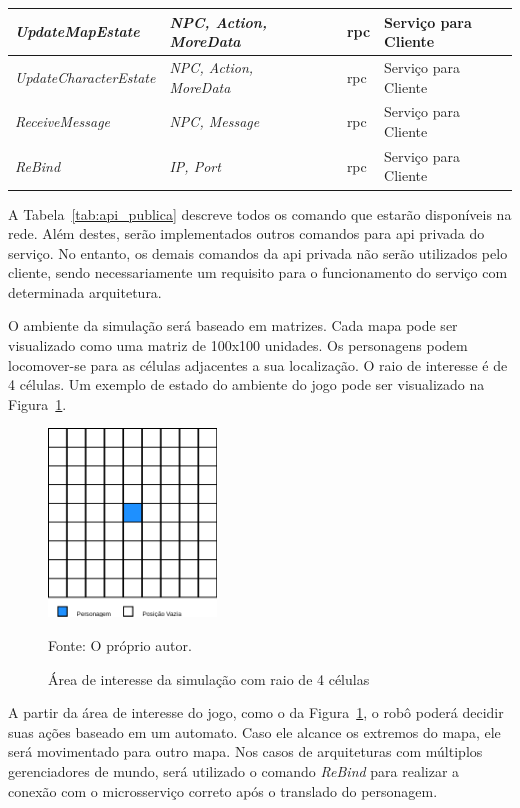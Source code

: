 \begin{table}[htb!]
\begin{adjustbox}{max width=\textwidth}
\begin{tabular}{|l|l|l|l|l|}
\textit{UpdateMapEstate}       & \textit{NPC, Action, MoreData} &           & \ac{rpc}           & Serviço para Cliente \\ \hline
\textit{UpdateCharacterEstate} & \textit{NPC, Action, MoreData} &           & \ac{rpc}           & Serviço para Cliente \\ \hline
\textit{ReceiveMessage}        & \textit{NPC, Message}          &           & \ac{rpc}           & Serviço para Cliente \\ \hline
\textit{ReBind}                & \textit{IP, Port}              &           & \ac{rpc}           & Serviço para Cliente \\ \hline
\end{tabular}
\end{adjustbox}
\end{table}

A Tabela~\ref{tab:api_publica} descreve todos os comando que estarão disponíveis na rede.
%
Além destes, serão implementados outros comandos para \ac{api} privada do serviço.
%
No entanto, os demais comandos da \ac{api} privada não serão utilizados pelo cliente, sendo necessariamente um requisito para o funcionamento do serviço com determinada arquitetura.


O ambiente da simulação será baseado em matrizes. Cada mapa pode ser visualizado como uma matriz de 100x100 unidades.
%
Os personagens podem locomover-se para as células adjacentes a sua localização.
%
O raio de interesse é de 4 células.
%
Um exemplo de estado do ambiente do jogo pode ser visualizado na Figura~\ref{fig:roi}.

\begin{figure}[htb!]
  \caption{Área de interesse da simulação com raio de 4 células}
  \label{fig:roi}
  \includegraphics[height=5.0cm]{img/cap3/roi.png}
  \centering

  Fonte: O próprio autor.
\end{figure}

A partir da área de interesse do jogo, como o da Figura~\ref{fig:roi}, o robô poderá decidir suas ações baseado em um automato.
%
Caso ele alcance os extremos do mapa, ele será movimentado para outro mapa.
%
Nos casos de arquiteturas com múltiplos gerenciadores de mundo, será utilizado o comando \textit{ReBind} para realizar a conexão com o microsserviço correto após o translado do personagem.



